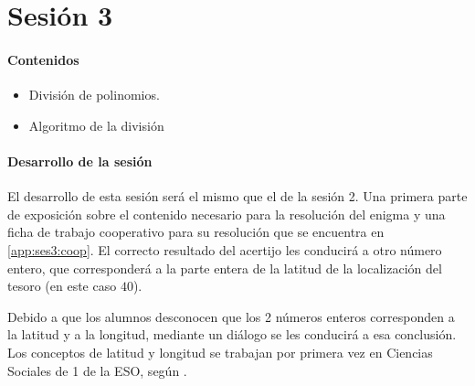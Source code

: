 






\section{Sesión 3}

\paragraph{Contenidos}
\begin{itemize}
	\item División de polinomios.
	\item Algoritmo de la división
\end{itemize}

\paragraph{Desarrollo de la sesión}

El desarrollo de esta sesión será el mismo que el de la sesión 2.
%
Una primera parte de exposición sobre el contenido necesario para la resolución del enigma y una ficha de trabajo cooperativo para su resolución que se encuentra en \ref{app:ses3:coop}.
%
El correcto resultado del acertijo les conducirá a otro número entero, que corresponderá a la parte entera de la latitud de la localización del tesoro (en este caso $40$).

Debido a que los alumnos desconocen que los 2 números enteros corresponden a la latitud y a la longitud, mediante un diálogo se les conducirá a esa conclusión.
%
Los conceptos de latitud y longitud se trabajan por primera vez en Ciencias Sociales de 1 de la ESO, según \bocm.


